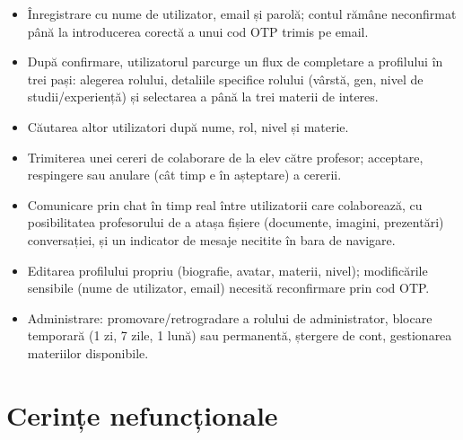 \begin{itemize}
    \item Înregistrare cu nume de utilizator, email și parolă; contul rămâne
    neconfirmat până la introducerea corectă a unui cod OTP trimis pe email.
    \item După confirmare, utilizatorul parcurge un flux de completare a profilului
    în trei pași: alegerea rolului, detaliile specifice rolului (vârstă, gen, nivel
    de studii/experiență) și selectarea a până la trei materii de interes.
    \item Căutarea altor utilizatori după nume, rol, nivel și materie.
    \item Trimiterea unei cereri de colaborare de la elev către profesor; acceptare,
    respingere sau anulare (cât timp e în așteptare) a cererii.
    \item Comunicare prin chat în timp real între utilizatorii care colaborează, cu
    posibilitatea profesorului de a atașa fișiere (documente, imagini, prezentări)
    conversației, și un indicator de mesaje necitite în bara de navigare.
    \item Editarea profilului propriu (biografie, avatar, materii, nivel); modificările
    sensibile (nume de utilizator, email) necesită reconfirmare prin cod OTP.
    \item Administrare: promovare/retrogradare a rolului de administrator, blocare
    temporară (1 zi, 7 zile, 1 lună) sau permanentă, ștergere de cont, gestionarea
    materiilor disponibile.
\end{itemize}

\section{Cerințe nefuncționale}


